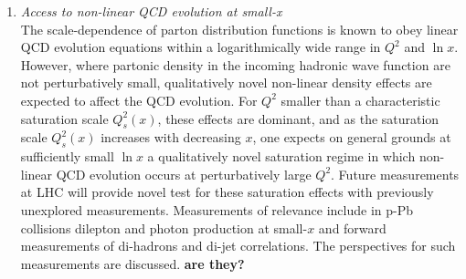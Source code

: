 \documentclass[../report.tex]{subfiles}
\begin{document}
\begin{enumerate}
\item {\it Access to non-linear QCD evolution at small-x}\\ The scale-dependence of parton distribution functions is known to obey linear QCD evolution equations within a logarithmically wide range in $Q^2$ and $\ln x$. However, where partonic density in the incoming hadronic wave function are not perturbatively small, qualitatively novel non-linear density effects are expected to affect the QCD evolution. For $Q^2$ smaller than a characteristic saturation scale $Q^2_s(x)$, these effects are dominant, and as the saturation scale $Q^2_s(x)$ increases with decreasing $x$, one expects on general grounds at sufficiently small $\ln x$ a qualitatively novel saturation regime in which non-linear QCD evolution occurs at perturbatively large $Q^2$. Future measurements at LHC will provide novel test for these saturation effects with previously unexplored measurements. Measurements of relevance include in p-Pb collisions dilepton and photon production at small-$x$ and forward measurements of di-hadrons and di-jet correlations. The perspectives for such measurements are discussed. {\bf are they?} 
\end{enumerate}
\end{document}

